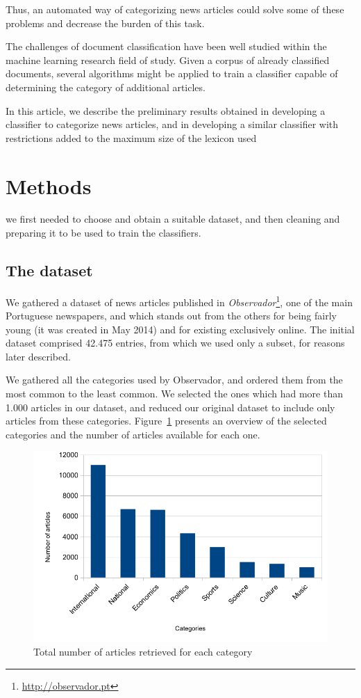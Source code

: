 \documentclass[conference]{IEEEtran}
\begin{document}
Thus, an automated way of categorizing news articles could solve some
of these problems and decrease the burden of this task.

The challenges of document classification have been well studied
within the machine learning research field of study. Given a corpus of
already classified documents, several algorithms might be applied to
train a classifier capable of determining the category of additional
articles.

In this article, we describe the preliminary results obtained in
developing a classifier to categorize news articles, and in developing
a similar classifier with restrictions added to the maximum size of
the lexicon used %

\section{Methods}
we first needed to choose and obtain a suitable dataset, and then
cleaning and preparing it to be used to train the classifiers.

\subsection{The dataset}
We gathered a dataset of news articles published in
\textit{Observador}\footnote{\url{http://observador.pt}}, one of the
main Portuguese newspapers, and which stands out from the others for
being fairly young (it was created in May 2014) and for existing
exclusively online. The initial dataset comprised 42.475 entries, from
which we used only a subset, for reasons later described.

We gathered all the categories used by Observador, and ordered them
from the most common to the least common. We selected the ones which
had more than 1.000 articles in our dataset, and reduced our original
dataset to include only articles from these categories.
Figure~\ref{fig:articles} presents an overview of the selected
categories and the number of articles available for each one.

\begin{figure}[htbp]
\centerline{\includegraphics[width=.97\columnwidth]{imgs/articles}}
\caption{Total number of articles retrieved for each category}
\label{fig:articles}
\end{figure}
\end{document}
